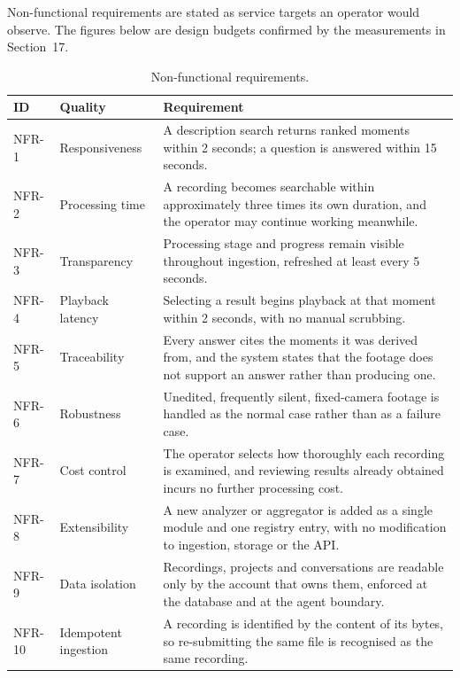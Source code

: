 \documentclass[11pt,a4paper]{article}
\begin{document}
Non-functional requirements are stated as service targets an operator would
observe. The figures below are design budgets confirmed by the measurements in
Section~17.

\begin{table}[htbp]
\centering
\small
\begin{tabularx}{\textwidth}{@{}lL{2.6cm}X@{}}
\toprule
\textbf{ID} & \textbf{Quality} & \textbf{Requirement} \\
\midrule
NFR-1 & Responsiveness & A description search returns ranked moments within 2 seconds; a question is answered within 15 seconds. \\
NFR-2 & Processing time & A recording becomes searchable within approximately three times its own duration, and the operator may continue working meanwhile. \\
NFR-3 & Transparency & Processing stage and progress remain visible throughout ingestion, refreshed at least every 5 seconds. \\
NFR-4 & Playback latency & Selecting a result begins playback at that moment within 2 seconds, with no manual scrubbing. \\
NFR-5 & Traceability & Every answer cites the moments it was derived from, and the system states that the footage does not support an answer rather than producing one. \\
NFR-6 & Robustness & Unedited, frequently silent, fixed-camera footage is handled as the normal case rather than as a failure case. \\
NFR-7 & Cost control & The operator selects how thoroughly each recording is examined, and reviewing results already obtained incurs no further processing cost. \\
NFR-8 & Extensibility & A new analyzer or aggregator is added as a single module and one registry entry, with no modification to ingestion, storage or the API. \\
NFR-9 & Data isolation & Recordings, projects and conversations are readable only by the account that owns them, enforced at the database and at the agent boundary. \\
NFR-10 & Idempotent ingestion & A recording is identified by the content of its bytes, so re-submitting the same file is recognised as the same recording. \\
\bottomrule
\end{tabularx}
\caption{Non-functional requirements.}
\end{table}

\end{document}
